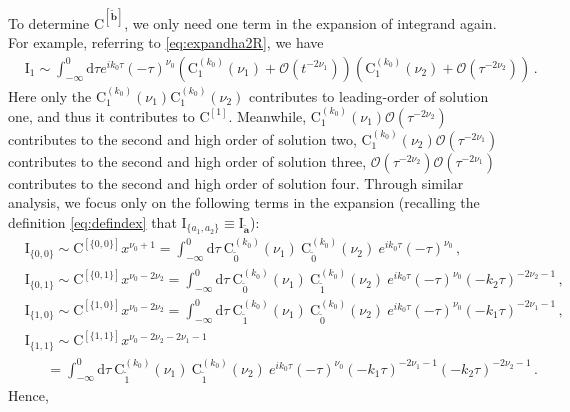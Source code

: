 \documentclass[a4paper,11pt]{article}
\newcommand{\nn}{\nonumber}
\newcommand{\nd}{\mathrm{d}}
\begin{document}
To determine $\text{C}^{[\tilde{\bm{b}}]}$, we only need one term in the expansion of integrand again. For example, referring to \eqref{eq:expandha2R}, we have
\begin{align}
&\text{I}_{1}\sim\int_{-\infty}^0 \nd \tau e^{ i k_0 \tau} (-\tau)^{\nu_0}
\left(\text{C}_1^{(k_0)}(\nu_1)  +  \mathcal{O}(t^{-2\nu_1})\right)
\left(\text{C}_1^{(k_0)}(\nu_2) +  \mathcal{O}(\tau^{-2\nu_2}) \right) \,.
\end{align}
Here only the $\text{C}_1^{(k_0)}(\nu_1)\text{C}_1^{(k_0)}(\nu_2)$ contributes to leading-order of solution one, and thus it contributes to $\text{C}^{[1]}$. Meanwhile, $\text{C}_1^{(k_0)}(\nu_1)\mathcal{O}(\tau^{-2\nu_2})$ contributes to the second and high order of solution two, $\text{C}_1^{(k_0)}(\nu_2)\mathcal{O}(\tau^{-2\nu_1})$ contributes to the second and high order of solution three, $\mathcal{O}(\tau^{-2\nu_2})\mathcal{O}(\tau^{-2\nu_1})$ contributes to the second and high order of solution four. Through similar analysis, we focus only on the following terms in the expansion (recalling the definition \eqref{eq:defindex} that $\text{I}_{\{a_1,a_2\}}\equiv\text{I}_{\tilde{\bm{a}}}$):
\begin{align}
&\text{I}_{\{0,0\}}\sim \text{C}^{[\{0,0\}]} x^{\nu_0+1} = \int_{-\infty}^0 \nd \tau ~ \text{C}_{\tilde{0}}^{(k_0)}(\nu_1)~ \text{C}_{\tilde{0}}^{(k_0)}(\nu_2) ~ e^{ i k_0 \tau} (-\tau)^{\nu_0} \,, \nn\\
&\text{I}_{\{0,1\}}\sim \text{C}^{[\{0,1\}]} x^{\nu_0-2\nu_2} = \int_{-\infty}^0 \nd \tau ~ \text{C}_{\tilde{0}}^{(k_0)}(\nu_1) ~ \text{C}_{\tilde{1}}^{(k_0)}(\nu_2) ~ e^{ i k_0 \tau} (-\tau)^{\nu_0}(-k_2\tau)^{-2\nu_2-1} \,, \nn\\
&\text{I}_{\{1,0\}}\sim \text{C}^{[\{1,0\}]} x^{\nu_0-2\nu_2} = \int_{-\infty}^0 \nd \tau ~ \text{C}_{\tilde{1}}^{(k_0)}(\nu_1) ~ \text{C}_{\tilde{0}}^{(k_0)}(\nu_2) ~ e^{ i k_0 \tau} (-\tau)^{\nu_0}(-k_1\tau)^{-2\nu_1-1} \,, \nn\\
&\text{I}_{\{1,1\}}\sim \text{C}^{[\{1,1\}]} x^{\nu_0-2\nu_2-2\nu_1-1} \nn\\
&~~~~~~~= \int_{-\infty}^0 \nd \tau ~ \text{C}_{\tilde{1}}^{(k_0)}(\nu_1) ~ \text{C}_{\tilde{1}}^{(k_0)}(\nu_2) ~ e^{ i k_0 \tau} (-\tau)^{\nu_0}(-k_1\tau)^{-2\nu_1-1}(-k_2\tau)^{-2\nu_2-1} \,. 
\end{align}
Hence,
\end{document}
